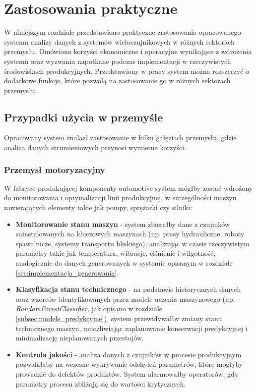 \section{Zastosowania praktyczne}
\label{sec:zastosowania_praktyczne}

W niniejszym rozdziale przedstawiono praktyczne zastosowania opracowanego systemu analizy danych z
systemów wieloczujnikowych w różnych sektorach przemysłu. Omówiono korzyści ekonomiczne i operacyjne wynikające z wdrożenia systemu
oraz wyzwania napotkane podczas implementacji w rzeczywistych środowiskach produkcyjnych. Przedstawiony w pracy system można rozszerzyć o dodatkowe funkcje, które pozwolą na zastosowanie go w różnych sektorach przemysłu.

\subsection{Przypadki użycia w przemyśle}
\label{subsec:przypadki_uzycia}

Opracowany system znalazł zastosowanie w kilku gałęziach przemysłu, gdzie analiza danych strumieniowych przynosi wymierne korzyści.

\subsubsection{Przemysł motoryzacyjny}
\label{subsubsec:przemysl_motoryzacyjny}

W fabryce produkującej komponenty automotive system mógłby zostać wdrożony do monitorowania i optymalizacji linii produkcyjnej, w szczególności maszyn zawierających elementy takie jak pompy, sprężarki czy silniki:

\begin{itemize}
    \item \textbf{Monitorowanie stanu maszyn} - system zbierałby dane z czujników zainstalowanych na kluczowych maszynach (np. prasy hydrauliczne, roboty spawalnicze, systemy transportu bliskiego),
    analizując w czasie rzeczywistym parametry takie jak temperatura, wibracje, ciśnienie i wilgotność, analogicznie do danych generowanych w systemie opisanym w rozdziale \ref{sec:implementacja_generowania}.
    \item \textbf{Klasyfikacja stanu technicznego} - na podstawie historycznych danych oraz wzorców identyfikowanych przez modele uczenia maszynowego (np. \textit{RandomForestClassifier}, jak opisano w rozdziale \ref{subsec:modele_predykcyjne}), system przewidywałby zmiany stanu technicznego maszyn,
    umożliwiając zaplanowanie konserwacji predykcyjnej i minimalizację nieplanowanych przestojów.
    \item \textbf{Kontrola jakości} - analiza danych z czujników w procesie produkcyjnym pozwalałaby na wczesne wykrywanie odchyleń parametrów, które mogłyby prowadzić do defektów
    produktów. System alarmowałby operatorów, gdy parametry procesu zbliżają się do wartości krytycznych.
\end{itemize}


